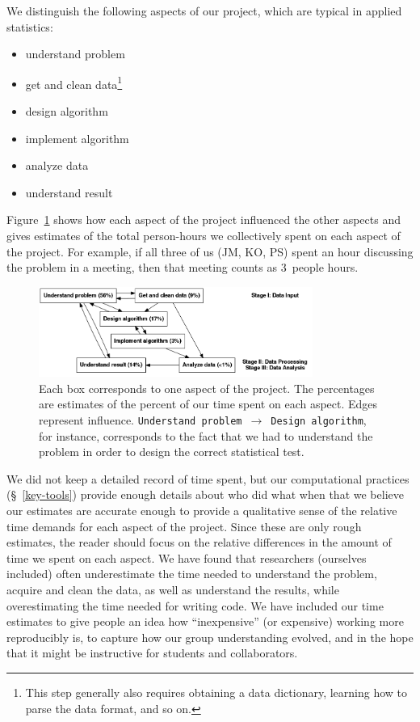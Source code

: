 \documentclass[]{article}
\begin{document}
We distinguish the following aspects of our project, which are typical in
applied statistics:
\begin{itemize}
    \item understand problem
    \item get and clean data\footnote{
        This step generally also requires obtaining a data dictionary, learning
        how to parse the data format, and so on.
        }
    \item design algorithm
    \item implement algorithm
    \item analyze data
    \item understand result
\end{itemize}
Figure~\ref{fig:work_process} shows how each aspect of the
project influenced the other aspects and gives estimates of the total person-hours
we collectively spent on each aspect of the project.
For example, if all three of us (JM, KO, PS) spent an hour discussing the
problem in a meeting, then that meeting counts as 3~people hours.

\begin{figure}[h]
  \centering
    \includegraphics[width=0.8\textwidth]{_fig/work_process_bids.png}
  \caption{
  \small
    Each box corresponds to one aspect of the project.
    The percentages are estimates of the percent of our time spent on each aspect.
    Edges represent influence.
    \texttt{Understand problem}~$\to$~\texttt{Design algorithm}, for instance,
    corresponds to the fact that we had to understand the problem in order to
    design the correct statistical test.\label{fig:work_process}}
\end{figure}

We did not keep a detailed record of time spent, but
our computational practices (\S~\ref{key-tools}) provide enough details about
who did what when that we believe our estimates are accurate enough to provide
a qualitative sense of the relative time demands for each aspect of the
project.
Since these are only rough estimates, the reader should focus on the
relative differences in the amount of time we spent on each aspect.
We have found that researchers (ourselves included) often underestimate the
time needed to understand the problem, acquire and clean the data, as well as
understand the results, while overestimating the time needed for writing code.
We have included our time estimates to give people an idea how ``inexpensive''
(or expensive) working more reproducibly is, to capture how our group
understanding evolved, and in the  hope that it might be instructive for
students and collaborators.
\end{document}
